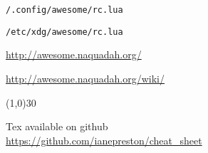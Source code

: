 

\texttt{/.config/awesome/rc.lua}

\texttt{/etc/xdg/awesome/rc.lua}

\vspace{\baselineskip} %



\url{http://awesome.naquadah.org/}

\url{http://awesome.naquadah.org/wiki/}


\vspace{\baselineskip}
\linethickness{0.5mm} %
{\color{mygray}\line(1,0){30}} %

\footnotesize{
Tex available on github\\ 
\url{https://github.com/ianepreston/cheat_sheet}\\
}